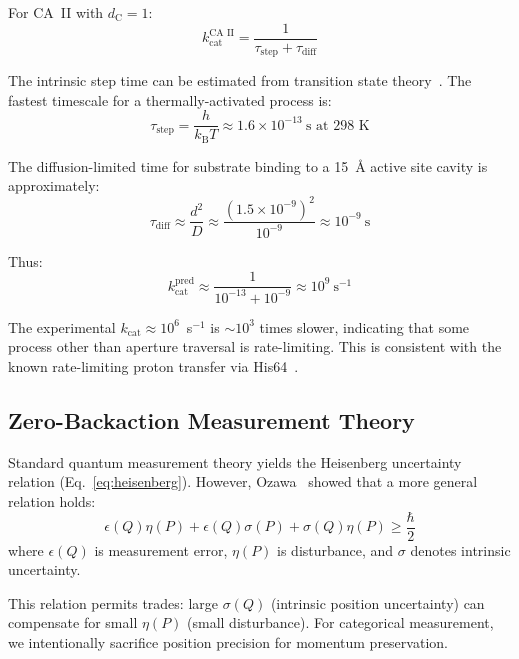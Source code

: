 \documentclass[twocolumn,amsmath,amssymb,aps,prb,superscriptaddress,longbibliography]{revtex4-2}
\newcommand{\dC}{d_{\mathrm{C}}}
\newcommand{\kcat}{k_{\mathrm{cat}}}
\newcommand{\kB}{k_{\mathrm{B}}}
\begin{document}
For CA~II with $\dC = 1$:
\begin{equation}
\kcat^{\text{CA II}} = \frac{1}{\tau_{\text{step}} + \tau_{\text{diff}}}
\end{equation}

The intrinsic step time can be estimated from transition state theory~\cite{Eyring1935}. The fastest timescale for a thermally-activated process is:
\begin{equation}
\tau_{\text{step}} = \frac{h}{\kB T} \approx 1.6 \times 10^{-13}~\text{s at 298 K}
\label{eq:tau-step}
\end{equation}

The diffusion-limited time for substrate binding to a 15~\AA{} active site cavity is approximately:
\begin{equation}
\tau_{\text{diff}} \approx \frac{d^2}{D} \approx \frac{(1.5 \times 10^{-9})^2}{10^{-9}} \approx 10^{-9}~\text{s}
\end{equation}

Thus:
\begin{equation}
\kcat^{\text{pred}} \approx \frac{1}{10^{-13} + 10^{-9}} \approx 10^9~\text{s}^{-1}
\end{equation}

The experimental $\kcat \approx 10^6$~s$^{-1}$ is $\sim 10^3$ times slower, indicating that some process other than aperture traversal is rate-limiting. This is consistent with the known rate-limiting proton transfer via His64~\cite{Silverman1988, Maupin2009}.

\subsection{Zero-Backaction Measurement Theory}
\label{sec:zero-backaction-theory}

Standard quantum measurement theory yields the Heisenberg uncertainty relation (Eq.~\ref{eq:heisenberg}). However, Ozawa~\cite{Ozawa2003} showed that a more general relation holds:
\begin{equation}
\epsilon(Q)\eta(P) + \epsilon(Q)\sigma(P) + \sigma(Q)\eta(P) \geq \frac{\hbar}{2}
\label{eq:ozawa}
\end{equation}
where $\epsilon(Q)$ is measurement error, $\eta(P)$ is disturbance, and $\sigma$ denotes intrinsic uncertainty.

This relation permits trades: large $\sigma(Q)$ (intrinsic position uncertainty) can compensate for small $\eta(P)$ (small disturbance). For categorical measurement, we intentionally sacrifice position precision for momentum preservation.
\end{document}
